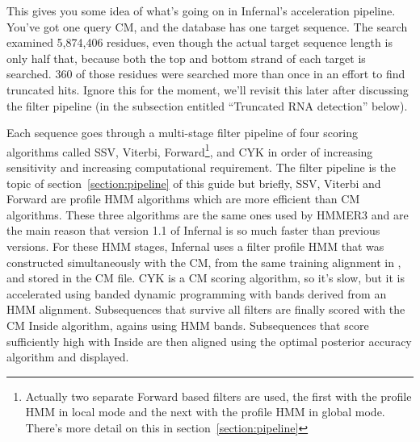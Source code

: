 This gives you some idea of what's going on in Infernal's acceleration
pipeline. You've got one query CM, and the database has one target
sequence. The search examined 5,874,406 residues, even though the
actual target sequence length is only half that, because both the top
and bottom strand of each target is searched. 360 of those residues
were searched more than once in an effort to find truncated
hits. Ignore this for the moment, we'll revisit this later after
discussing the filter pipeline (in the subsection entitled ``Truncated
RNA detection'' below).

Each sequence goes through a multi-stage filter pipeline of four
scoring algorithms called SSV, Viterbi, Forward\footnote{Actually two
  separate Forward based filters are used, the first with the profile
  HMM in local mode and the next with the profile HMM in global
  mode. There's more detail on this in
  section~\ref{section:pipeline}}, and CYK in order of increasing
sensitivity and increasing computational requirement. The filter
pipeline is the topic of section~\ref{section:pipeline} of this guide
but briefly, SSV, Viterbi and Forward are profile HMM algorithms which
are more efficient than CM algorithms. These three algorithms are the
same ones used by HMMER3 and are the main reason that version 1.1 of
Infernal is so much faster than previous versions. For these HMM
stages, Infernal uses a filter profile HMM that was constructed
simultaneously with the CM, from the same training alignment in
, and stored in the CM file. CYK is a CM scoring
algorithm, so it's slow, but it is accelerated using banded dynamic
programming with bands derived from an HMM alignment. Subsequences
that survive all filters are finally scored with the CM Inside
algorithm, agains using HMM bands. Subsequences that score
sufficiently high with Inside are then aligned using the optimal
posterior accuracy algorithm and displayed.

